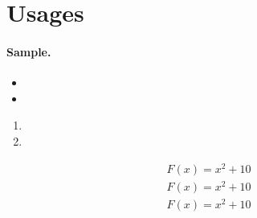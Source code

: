 \section{Usages}

\def\ftext{\lipsum[75]}

\paragraph{Sample.} \ftext

\begin{itemize}
  \item \ftext
  \item \ftext
\end{itemize}

\begin{enumerate}
  \item \ftext
  \item \ftext
\end{enumerate}

\noh \ftext
\snoh \ftext
\sno \ftext
\no \ftext
\snoh \ftext
\ssnoh \ttt\ftext

\begin{definition}[Sample]
  \ftext
\end{definition}

\noh \ftext
\snoh \ftext
\sno \ftext
\no \ftext

\begin{align*}
  F(x) = x^2 + 10 \\
  F(x) = x^2 + 10 \\
  F(x) = x^2 + 10
\end{align*}

\snoh \ftext
\ssnoh \ftext



\the\abovedisplayskip